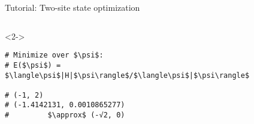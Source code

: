 \begin{frame}[fragile]{Tutorial: Two-site state optimization}
\begin{columns}
\begin{column}{5cm}
\begin{onlyenv}<2->

\begin{lstlisting}[style=julia, numbers=none, mathescape, basicstyle=\small]
# Minimize over $\psi$:
# E($\psi$) = $\langle\psi$|H|$\psi\rangle$/$\langle\psi$|$\psi\rangle$

# (-1, 2)
# (-1.4142131, 0.0010865277)
#         $\approx$ (-√2, 0)
\end{lstlisting}

\end{onlyenv}

\end{column}

\end{columns}

\end{frame}
